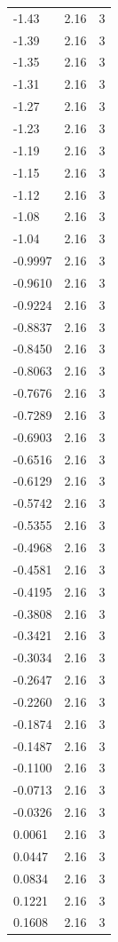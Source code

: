 \begin{longtable}{lrr}
  -1.43 & 2.16 & 3 \\
  -1.39 & 2.16 & 3 \\
  -1.35 & 2.16 & 3 \\
  -1.31 & 2.16 & 3 \\
  -1.27 & 2.16 & 3 \\
  -1.23 & 2.16 & 3 \\
  -1.19 & 2.16 & 3 \\
  -1.15 & 2.16 & 3 \\
  -1.12 & 2.16 & 3 \\
  -1.08 & 2.16 & 3 \\
  -1.04 & 2.16 & 3 \\
  -0.9997 & 2.16 & 3 \\
  -0.9610 & 2.16 & 3 \\
  -0.9224 & 2.16 & 3 \\
  -0.8837 & 2.16 & 3 \\
  -0.8450 & 2.16 & 3 \\
  -0.8063 & 2.16 & 3 \\
  -0.7676 & 2.16 & 3 \\
  -0.7289 & 2.16 & 3 \\
  -0.6903 & 2.16 & 3 \\
  -0.6516 & 2.16 & 3 \\
  -0.6129 & 2.16 & 3 \\
  -0.5742 & 2.16 & 3 \\
  -0.5355 & 2.16 & 3 \\
  -0.4968 & 2.16 & 3 \\
  -0.4581 & 2.16 & 3 \\
  -0.4195 & 2.16 & 3 \\
  -0.3808 & 2.16 & 3 \\
  -0.3421 & 2.16 & 3 \\
  -0.3034 & 2.16 & 3 \\
  -0.2647 & 2.16 & 3 \\
  -0.2260 & 2.16 & 3 \\
  -0.1874 & 2.16 & 3 \\
  -0.1487 & 2.16 & 3 \\
  -0.1100 & 2.16 & 3 \\
  -0.0713 & 2.16 & 3 \\
  -0.0326 & 2.16 & 3 \\
  0.0061 & 2.16 & 3 \\
  0.0447 & 2.16 & 3 \\
  0.0834 & 2.16 & 3 \\
  0.1221 & 2.16 & 3 \\
  0.1608 & 2.16 & 3 \\

\end{longtable}
